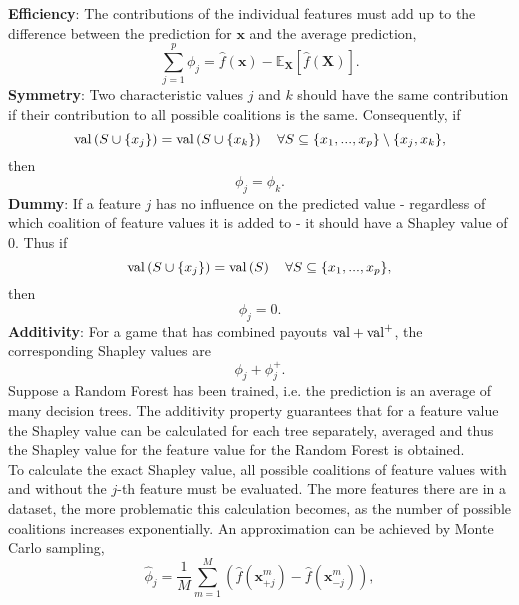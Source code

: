 \textbf{Efficiency}: The contributions of the individual features must add up to the difference between the prediction for $\pmb{x}$ and the average prediction,
\begin{equation*}
    \sum_{j=1}^p\phi_j=\widehat{f}(\pmb{x})-\mathbb{E}_{\pmb{X}}\left[\widehat{f}(\pmb{X})\right].
\end{equation*}
\textbf{Symmetry}: Two characteristic values $j$ and $k$ should have the same contribution if their contribution to all possible coalitions is the same. Consequently, if
\begin{equation*}
    \hbox{val}\left(S\cup\lbrace x_j\rbrace\right) = \hbox{val}\left(S\cup\lbrace x_k\rbrace\right)\hspace{10pt}\forall S\subseteq\lbrace x_1,...,x_p\rbrace\setminus\lbrace x_j,x_k\rbrace,
\end{equation*}
then
\begin{equation*}
    \phi_j=\phi_k.
\end{equation*}
\textbf{Dummy}: If a feature $j$ has no influence on the predicted value - regardless of which coalition of feature values it is added to - it should have a Shapley value of 0. Thus if
\begin{equation*}
    \hbox{val}\left(S\cup\lbrace x_j\rbrace\right) = \hbox{val}\left(S\right)\hspace{10pt}\forall S\subseteq\lbrace x_1,...,x_p\rbrace,
\end{equation*}
then
\begin{equation*}
    \phi_j=0.
\end{equation*}
\textbf{Additivity}: For a game that has combined payouts $\hbox{val}+\hbox{val}^+$, the corresponding Shapley values are
\begin{equation*}
    \phi_j+\phi_j^+.
\end{equation*}
Suppose a Random Forest has been trained, i.e. the prediction is an average of many decision trees. The additivity property guarantees that for a feature value the Shapley value can be calculated for each tree separately, averaged and thus the Shapley value for the feature value for the Random Forest is obtained. \\
To calculate the exact Shapley value, all possible coalitions of feature values with and without the $j$-th feature must be evaluated. The more features there are in a dataset, the more problematic this calculation becomes, as the number of possible coalitions increases exponentially. An approximation can be achieved by Monte Carlo sampling,
\begin{equation}
    \widehat{\phi}_j=\frac{1}{M}\sum_{m=1}^M\left(\widehat{f}\left(\pmb{x}_{+j}^m\right)-\widehat{f}\left(\pmb{x}_{-j}^m\right)\right),
\end{equation}
